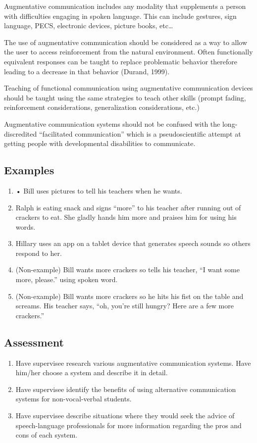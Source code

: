 Augmentative communication includes any modality that supplements a person with difficulties engaging in spoken language. This can include gestures, sign language, PECS, electronic devices, picture books, etc…

The use of augmentative communication should be considered as a way to allow the user to access reinforcement from the natural environment. Often functionally equivalent responses can be taught to replace problematic behavior therefore leading to a decrease in that behavior (Durand, 1999).

Teaching of functional communication using augmentative communication devices should be taught using the same strategies to teach other skills (prompt fading, reinforcement considerations, generalization considerations, etc.)

Augmentative communication systems should not be confused with the long-discredited ``facilitated communication'' which is a pseudoscientific attempt at getting people with developmental disabilities to communicate.

\subsection{Examples}
\begin{enumerate}
\item     • Bill uses pictures to tell his teachers when he wants.
\item Ralph is eating snack and signs ``more'' to his teacher after running out of crackers to eat. She gladly hands him more and praises him for using his words.
\item Hillary uses an app on a tablet device that generates speech sounds so others respond to her.
\item (Non-example) Bill wants more crackers so tells his teacher, ``I want some more, please.'' using spoken word.
\item (Non-example) Bill wants more crackers so he hits his fist on the table and screams. His teacher says, ``oh, you're still hungry? Here are a few more crackers.''
\end{enumerate}
%
\subsection{Assessment}
\begin{enumerate}
\item Have supervisee research various augmentative communication systems. Have him/her choose a system and describe it in detail.
\item Have supervisee identify the benefits of using alternative communication systems for non-vocal-verbal students.
\item Have supervisee describe situations where they would seek the advice of speech-language professionals for more information regarding the pros and cons of each system.
\end{enumerate}
%
